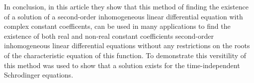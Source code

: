 \documentclass[mla9]{mla}
\begin{document}
\begin{paper}
In conclusion, in this article they show that this method of finding the existence of a solution of a second-order inhomogeneous linear differential equation with complex constant coefficents, can be used in many applications to find the existence of both real and non-real constant coefficients second-order inhomogeneous linear differential equations without any restrictions on the roots of the characteristic equation of this function. To demonstrate this versitility of this method was used to show that a solution exists for the time-independent Schrodinger equations.

\end{paper}

\begin{workscited}
    \nocite{*}
    \printbibliography[heading=none]
    
\end{workscited}
\end{document}

